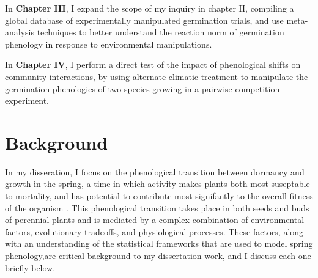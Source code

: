 \documentclass{article}\usepackage[]{graphicx}\usepackage[]{color}
\begin{document}
\par In \textbf{Chapter III}, I expand the scope of my inquiry in chapter II, compiling a global database of experimentally manipulated germination trials, and use meta-analysis techniques to better understand the reaction norm of germination phenology in response to environmental manipulations.
\par In \textbf{Chapter IV}, I perform a direct test of the impact of phenological shifts on community interactions, by using alternate climatic treatment to manipulate the germination phenologies of two species growing in a pairwise competition experiment.

\section*{Background}
\indent\indent In my disseration, I focus on the phenological transition between dormancy and growth in the spring, a time in which activity makes plants both most suseptable to mortality, and has potential to contribute most signifantly to the overall fitness of the organism \citep{Rathcke1985}. This phenological transition takes place in both seeds and buds of perennial plants and is mediated by a complex combination of environmental factors, evolutionary tradeoffs, and physiological processes. These factors, along with an understanding of the statistical frameworks that are used to model spring phenology,are critical background to my dissertation work, and I discuss each one briefly below.\\
\end{document}
